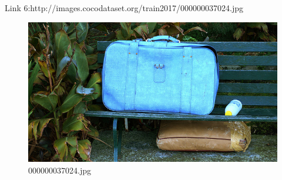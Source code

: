 Link 6:http://images.cocodataset.org/train2017/000000037024.jpg
    \begin{figure}[h]
        \centering
        \includegraphics[width=0.8\linewidth]{../image set/easy/000000037024.jpg}
        \caption{000000037024.jpg}
    \end{figure}
